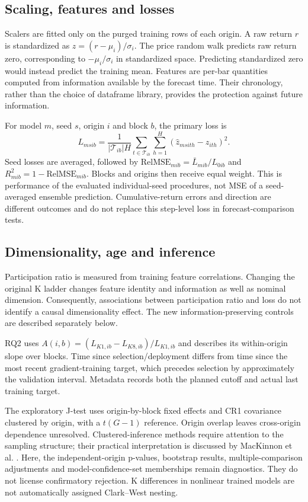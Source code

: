 \documentclass[onecolumn,journal,a4paper,11pt]{IEEEtran}
\begin{document}
\subsection{Scaling, features and losses}
Scalers are fitted only on the purged training rows of each origin. A raw
return $r$ is standardized as $z=(r-\mu_i)/\sigma_i$. The price random walk
predicts raw return zero, corresponding to $-\mu_i/\sigma_i$ in standardized
space. Predicting standardized zero would instead predict the training mean.
Features are per-bar quantities computed from information available by the
forecast time. Their chronology, rather than the choice of dataframe library,
provides the protection against future information.

For model $m$, seed $s$, origin $i$ and block $b$, the primary loss is
\begin{equation}
 L_{msib}=\frac{1}{|\mathcal T_{ib}|H}
 \sum_{t\in\mathcal T_{ib}}\sum_{h=1}^{H}
 (\hat z_{msith}-z_{ith})^2.
\end{equation}
Seed losses are averaged, followed by
$\mathrm{RelMSE}_{mib}=\bar L_{mib}/L_{0ib}$ and
$R^2_{mib}=1-\mathrm{RelMSE}_{mib}$. Blocks and origins then receive equal
weight. This is performance of the evaluated individual-seed procedures,
not MSE of a seed-averaged ensemble prediction. Cumulative-return errors
and direction are different outcomes and do not replace this step-level
loss in forecast-comparison tests.

\subsection{Dimensionality, age and inference}
Participation ratio is measured from training feature correlations. Changing
the original K ladder changes feature identity and information as well as
nominal dimension. Consequently, associations between participation ratio
and loss do not identify a causal dimensionality effect. The new
information-preserving controls are described separately below.

RQ2 uses $A(i,b)=(L_{K1,ib}-L_{K8,ib})/L_{K1,ib}$ and describes its
within-origin slope over blocks. Time since selection/deployment differs
from time since the most recent gradient-training target, which precedes
selection by approximately the validation interval. Metadata records both
the planned cutoff and actual last training target.

The exploratory J-test uses origin-by-block fixed effects and CR1 covariance
clustered by origin, with a $t(G-1)$ reference. Origin overlap leaves
cross-origin dependence unresolved. Clustered-inference methods require
attention to the sampling structure; their practical interpretation is
discussed by MacKinnon et al. \cite{mackinnon2023cluster}. Here, the
independent-origin p-values, bootstrap results, multiple-comparison
adjustments and model-confidence-set memberships remain diagnostics.
They do not license confirmatory rejection. K differences in nonlinear
trained models are not automatically assigned Clark--West nesting.
\end{document}
